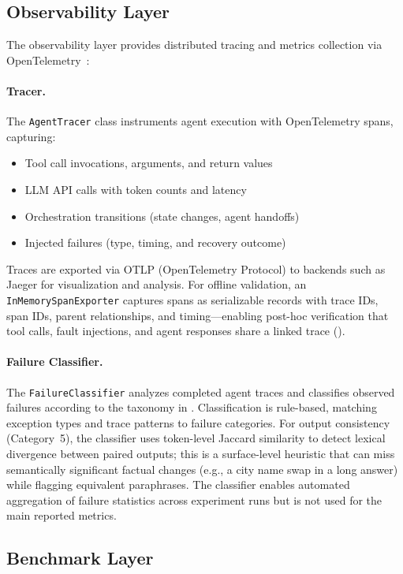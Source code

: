 \documentclass[make,article,submit,moreauthors,pdftex]{mdpi}
\begin{document}
\subsection{Observability Layer}

The observability layer provides distributed tracing and metrics collection via OpenTelemetry~\cite{opentelemetry2024}:

\paragraph{Tracer.}
The \texttt{AgentTracer} class instruments agent execution with OpenTelemetry spans, capturing:
\begin{itemize}
  \item Tool call invocations, arguments, and return values
  \item LLM API calls with token counts and latency
  \item Orchestration transitions (state changes, agent handoffs)
  \item Injected failures (type, timing, and recovery outcome)
\end{itemize}

Traces are exported via OTLP (OpenTelemetry Protocol) to backends such as Jaeger for visualization and analysis. For offline validation, an \texttt{InMemorySpanExporter} captures spans as serializable records with trace IDs, span IDs, parent relationships, and timing---enabling post-hoc verification that tool calls, fault injections, and agent responses share a linked trace ().

\paragraph{Failure Classifier.}
The \texttt{FailureClassifier} analyzes completed agent traces and classifies observed failures according to the taxonomy in . Classification is rule-based, matching exception types and trace patterns to failure categories. For output consistency (Category~5), the classifier uses token-level Jaccard similarity to detect lexical divergence between paired outputs; this is a surface-level heuristic that can miss semantically significant factual changes (e.g., a city name swap in a long answer) while flagging equivalent paraphrases. The classifier enables automated aggregation of failure statistics across experiment runs but is not used for the main reported metrics.

\subsection{Benchmark Layer}
\end{document}
